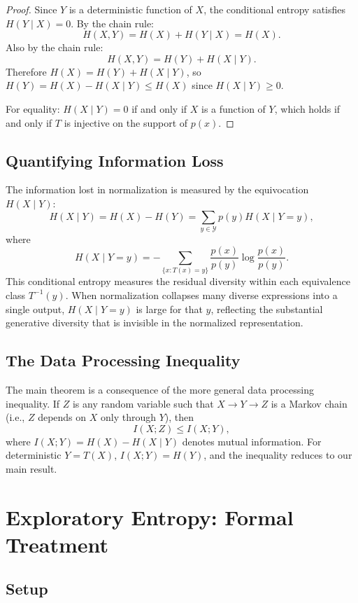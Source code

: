 \documentclass[12pt,a4paper]{article}
\theoremstyle{definition}
\theoremstyle{plain}
\theoremstyle{remark}
\newcommand{\calY}{\mathcal{Y}}
\begin{document}
\begin{proof}
Since $Y$ is a deterministic function of $X$, the conditional entropy satisfies
$H(Y \mid X) = 0$. By the chain rule:
\[
H(X, Y) = H(X) + H(Y \mid X) = H(X).
\]
Also by the chain rule:
\[
H(X, Y) = H(Y) + H(X \mid Y).
\]
Therefore $H(X) = H(Y) + H(X \mid Y)$, so $H(Y) = H(X) - H(X \mid Y) \leq H(X)$ since
$H(X \mid Y) \geq 0$.

For equality: $H(X \mid Y) = 0$ if and only if $X$ is a function of $Y$, which holds if and
only if $T$ is injective on the support of $p(x)$.
\end{proof}

\subsection{Quantifying Information Loss}

The information lost in normalization is measured by the equivocation $H(X \mid Y)$:
\[
H(X \mid Y) = H(X) - H(Y) = \sum_{y \in \calY} p(y) H(X \mid Y = y),
\]
where
\[
H(X \mid Y = y) = -\sum_{\{x : T(x) = y\}} \frac{p(x)}{p(y)} \log \frac{p(x)}{p(y)}.
\]
This conditional entropy measures the residual diversity within each equivalence class
$T^{-1}(y)$. When normalization collapses many diverse expressions into a single output,
$H(X \mid Y = y)$ is large for that $y$, reflecting the substantial generative diversity
that is invisible in the normalized representation.

\subsection{The Data Processing Inequality}

The main theorem is a consequence of the more general data processing inequality. If $Z$ is
any random variable such that $X \to Y \to Z$ is a Markov chain (i.e., $Z$ depends on $X$
only through $Y$), then
\[
I(X; Z) \leq I(X; Y),
\]
where $I(X; Y) = H(X) - H(X \mid Y)$ denotes mutual information. For deterministic $Y = T(X)$,
$I(X; Y) = H(Y)$, and the inequality reduces to our main result.

\section{Exploratory Entropy: Formal Treatment}
\label{app:exploratory}

\subsection{Setup}
\end{document}

